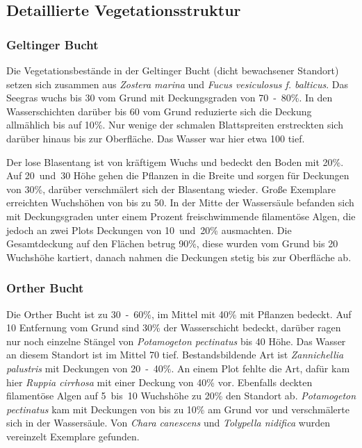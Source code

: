 
\subsection{Detaillierte Vegetationsstruktur}

\subsubsection{Geltinger Bucht}

Die Vegetationsbestände in der Geltinger Bucht (dicht bewachsener Standort) setzen sich zusammen aus \textit{Zostera marina} und \textit{Fucus vesiculosus f. balticus}. Das Seegras wuchs bis \unit{30}{\centi\metre} vom Grund mit Deckungsgraden von \unit{70-80}{\%}. In den Wasserschichten darüber bis \unit{60}{\centi\metre} vom Grund reduzierte sich die Deckung allmählich bis auf \unit{10}{\%}. Nur wenige der schmalen Blattspreiten erstreckten sich darüber hinaus bis zur Oberfläche. Das Wasser war hier etwa \unit{100}{\centi\metre} tief.

Der lose Blasentang ist von kräftigem Wuchs und bedeckt den Boden mit \unit{20}{\%}. Auf \unit{20 und 30}{\centi\metre} Höhe gehen die Pflanzen in die Breite und sorgen für Deckungen von \unit{30}{\%}, darüber verschmälert sich der Blasentang wieder. Große Exemplare erreichten Wuchshöhen von bis zu \unit{50}{\centi\metre}.
In der Mitte der Wassersäule befanden sich mit Deckungsgraden unter einem Prozent freischwimmende filamentöse Algen, die jedoch an zwei Plots Deckungen von \unit{10 und 20}{\%} ausmachten. Die Gesamtdeckung auf den Flächen betrug \unit{90}{\%}, diese wurden vom Grund bis \unit{20}{\centi\metre} Wuchshöhe kartiert, danach nahmen die Deckungen stetig bis zur Oberfläche ab.

\subsubsection{Orther Bucht}

Die Orther Bucht ist zu \unit{30-60}{\%}, im Mittel mit \unit{40}{\%} mit Pflanzen bedeckt. Auf \unit{10}{\centi\metre} Entfernung vom Grund sind \unit{30}{\%} der Wasserschicht bedeckt, darüber ragen nur noch einzelne Stängel von \textit{Potamogeton pectinatus} bis \unit{40}{\centi\metre} Höhe. Das Wasser an diesem Standort ist im Mittel \unit{70}{\centi\metre} tief. Bestandsbildende Art ist \textit{Zannichellia palustris} mit Deckungen von \unit{20-40}{\%}. An einem Plot fehlte die Art, dafür kam hier \textit{Ruppia cirrhosa} mit einer Deckung von \unit{40}{\%} vor. Ebenfalls deckten filamentöse Algen auf \unit{5 bis 10}{\centi\metre} Wuchshöhe zu \unit{20}{\%} den Standort ab. \textit{Potamogeton pectinatus} kam mit Deckungen von bis zu \unit{10}{\%} am Grund vor und verschmälerte sich in der Wassersäule. Von \textit{Chara canescens} und \textit{Tolypella nidifica} wurden vereinzelt Exemplare gefunden.

